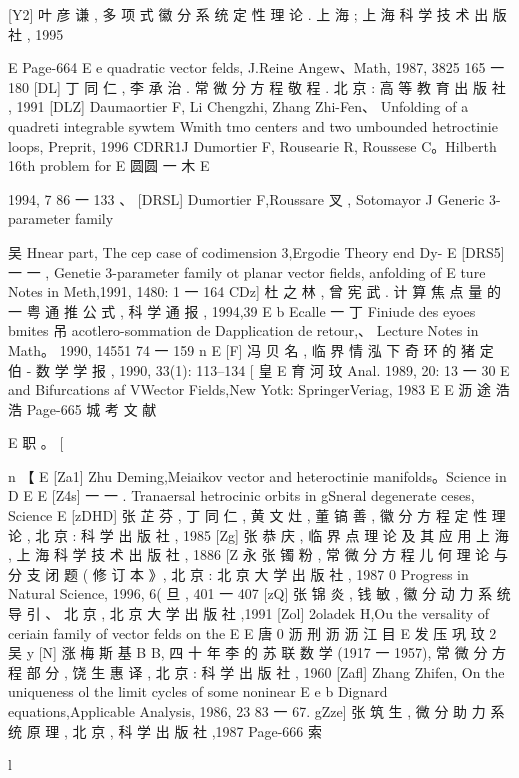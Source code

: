 [Y2] 叶 彦 谦 , 多 项 式 徽 分 系 统 定 性 理 论 . 上 海 ; 上 海 科 学 技 术 出 版 社 , 1995

E
Page-664
E
e
quadratic vector felds, J.Reine Angew、Math, 1987, 3825 165 一 180
[DL] 丁 同 仁 , 李 承 治 . 常 微 分 方 程 敬 程 . 北 京 : 高 等 教 育 出 版 社 , 1991
[DLZ] Daumaortier F, Li Chengzhi, Zhang Zhi-Fen、 Unfolding of a quadreti
integrable sywtem Wmith tmo centers and two umbounded hetroctinie
loops, Preprit, 1996
CDRR1J Dumortier F, Rousearie R, Roussese C。Hilberth 16th problem for
E 圆圆 一 木
E

1994, 7 86 一 133 、
[DRSL] Dumortier F,Roussare 叉 , Sotomayor J Generic 3-parameter family

吴
Hnear part, The cep case of codimension 3,Ergodie Theory end Dy-
E
[DRS5] 一 一 , Genetie 3-parameter family ot planar vector fields, anfolding of
E
ture Notes in Meth,1991, 1480: 1 一 164
CDz] 杜 之 林 , 曾 宪 武 . 计 算 焦 点 量 的 一 粤 通 推 公 式 , 科 学 通 报 , 1994,39
E b
Ecalle 一 丁 Finiude des eyoes bmites 吊 acotlero-sommation de
Dapplication de retour,、 Lecture Notes in Math。 1990, 14551 74 一 159
n
E
[F] 冯 贝 名 , 临 界 情 泓 下 奇 环 的 猪 定 伯 - 数 学 学 报 , 1990, 33(1): 113--134
[ 皇 E 育 河
玟
Anal. 1989, 20: 13 一 30
E
and Bifurcations af VWector Fields,New Yotk: SpringerVeriag, 1983
E
E 沥 途 浩 浩
Page-665
城 考 文 献

E 职 。
[

n
【
E
[Za1] Zhu Deming,Meiaikov vector and heteroctinie manifolds。Science in
D
E
E
[Z4s] 一 一 . Tranaersal hetrocinic orbits in gSneral degenerate ceses, Science
E
[zDHD] 张 芷 芬 , 丁 同 仁 , 黄 文 灶 , 董 镐 善 , 徽 分 方 程 定 性 理 论 , 北 京 : 科 学
出 版 社 , 1985
[Zg] 张 恭 庆 , 临 界 点 理 论 及 其 应 用 上 海 , 上 海 科 学 技 术 出 版 社 , 1886
[Z 永 张 镯 粉 , 常 微 分 方 程 儿 何 理 论 与 分 支 闭 题 ( 修 订 本 》, 北 京 : 北 京 大 学 出
版 社 , 1987
0
Progress in Natural Science, 1996, 6( 旦 , 401 一 407
[zQ] 张 锦 炎 , 钱 敏 , 徽 分 动 力 系 统 导 引 、 北 京 , 北 京 大 学 出 版 社 ,1991
[Zol] 2oladek H,Ou the versality of ceriain family of vector felds on the
E
E 唐 0 沥 刑 沥 沥 江 目
E 发 压 巩 玟 2 吴 y
[N] 涨 梅 斯 基 B B, 四 十 年 李 的 苏 联 数 学 (1917 一 1957), 常 微 分 方 程 部 分 ,
饶 生 惠 译 , 北 京 : 科 学 出 版 社 , 1960
[Zafl] Zhang Zhifen, On the uniqueness ol the limit cycles of some noninear
E
e
b
Dignard equations,Applicable Analysis, 1986, 23 83 一 67.
gZze] 张 筑 生 , 微 分 助 力 系 统 原 理 , 北 京 , 科 学 出 版 社 ,1987
Page-666
索

l

